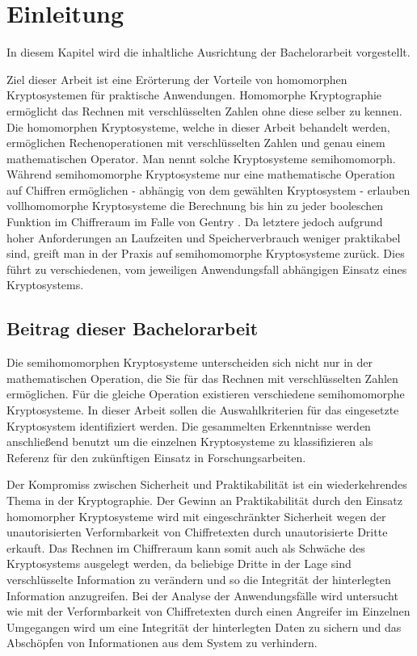 \chapter{Einleitung}

In diesem Kapitel wird die inhaltliche Ausrichtung der Bachelorarbeit vorgestellt. %

Ziel dieser Arbeit ist eine Erörterung der Vorteile von homomorphen Kryptosystemen für praktische Anwendungen. Homomorphe Kryptographie ermöglicht das Rechnen mit verschlüsselten Zahlen ohne diese selber zu kennen. Die homomorphen Kryptosysteme, welche in dieser Arbeit behandelt werden, ermöglichen Rechenoperationen mit verschlüsselten Zahlen und genau einem mathematischen Operator. Man nennt solche Kryptosysteme semihomomorph. Während semihomomorphe Kryptosysteme nur eine mathematische Operation auf Chiffren ermöglichen - abhängig von dem gewählten Kryptosystem - erlauben vollhomomorphe Kryptosysteme die Berechnung bis hin zu jeder booleschen Funktion im Chiffreraum im Falle von Gentry \cite{gentry2009fully}. Da letztere jedoch aufgrund hoher Anforderungen an Laufzeiten und Speicherverbrauch weniger praktikabel sind, greift man in der Praxis auf semihomomorphe Kryptosysteme zurück. Dies führt zu verschiedenen, vom jeweiligen Anwendungsfall abhängigen Einsatz eines Kryptosystems. 

\section{Beitrag dieser Bachelorarbeit}

Die semihomomorphen Kryptosysteme unterscheiden sich nicht nur in der mathematischen Operation, die Sie für das Rechnen mit verschlüsselten Zahlen ermöglichen. Für die gleiche Operation existieren verschiedene semihomomorphe Kryptosysteme. In dieser Arbeit sollen die Auswahlkriterien für das eingesetzte Kryptosystem identifiziert werden. Die gesammelten Erkenntnisse werden anschließend benutzt um die einzelnen Kryptosysteme zu klassifizieren als Referenz für den zukünftigen Einsatz in Forschungsarbeiten.

Der Kompromiss zwischen Sicherheit und Praktikabilität ist ein wiederkehrendes Thema in der Kryptographie. Der Gewinn an Praktikabilität durch den Einsatz homomorpher Kryptosysteme wird mit eingeschränkter Sicherheit wegen der unautorisierten Verformbarkeit von Chiffretexten durch unautorisierte Dritte erkauft. Das Rechnen im Chiffreraum kann somit auch als Schwäche des Kryptosystems ausgelegt werden, da beliebige Dritte in der Lage sind verschlüsselte Information zu verändern und so die Integrität der hinterlegten Information anzugreifen. Bei der Analyse der Anwendungsfälle wird untersucht wie mit der Verformbarkeit von Chiffretexten durch einen Angreifer im Einzelnen Umgegangen wird um eine Integrität der hinterlegten Daten zu sichern und das Abschöpfen von Informationen aus dem System zu verhindern.

